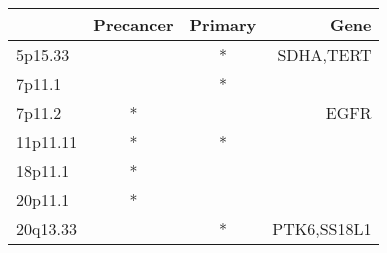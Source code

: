 \begin{tabular}{lccr}
\toprule
{} & Precancer & Primary &         Gene \\
\midrule
5p15.33  &           &       * &    SDHA,TERT \\
7p11.1   &           &       * &              \\
7p11.2   &         * &         &         EGFR \\
11p11.11 &         * &       * &              \\
18p11.1  &         * &         &              \\
20p11.1  &         * &         &              \\
20q13.33 &           &       * &  PTK6,SS18L1 \\
\bottomrule
\end{tabular}
